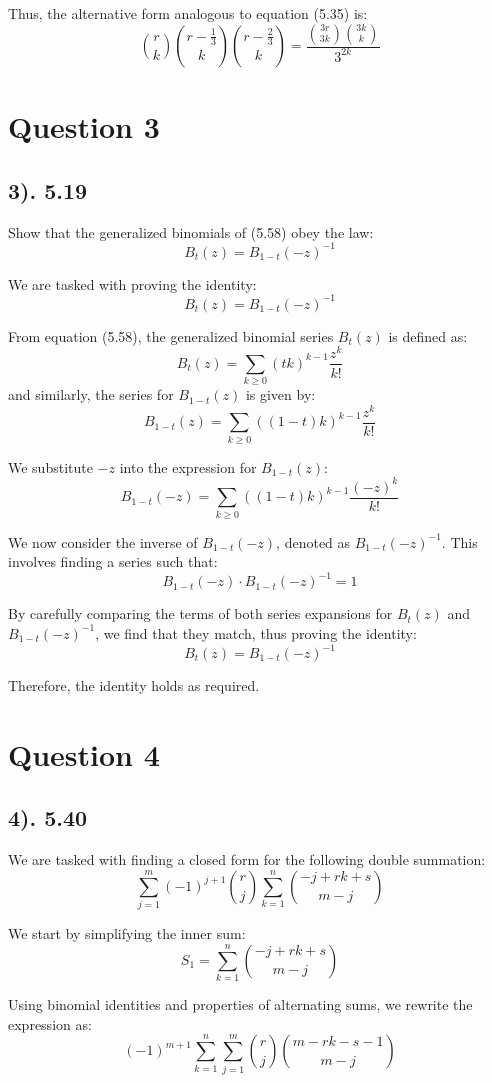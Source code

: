 \documentclass[12pt]{article}
\begin{document}
Thus, the alternative form analogous to equation (5.35) is:
\[
\binom{r}{k} 
\binom{r - \frac{1}{3}}{k} 
\binom{r - \frac{2}{3}}{k} 
= 
\frac{\binom{3r}{3k} 
\binom{3k}{k}} 
{3^{2k}}
\]

\section*{Question 3}
\subsection*{3). 5.19}
Show that the generalized binomials of (5.58) obey the law:
\[
B_t(z) = B_{1-t}(-z)^{-1}
\]

We are tasked with proving the identity:
\[
B_t(z) = B_{1-t}(-z)^{-1}
\]

From equation (5.58), the generalized binomial series \( B_t(z) \) is defined as:
\[
B_t(z) = \sum_{k \geq 0} (tk)^{k-1} \frac{z^k}{k!}
\]
and similarly, the series for \( B_{1-t}(z) \) is given by:
\[
B_{1-t}(z) = \sum_{k \geq 0} ((1-t)k)^{k-1} \frac{z^k}{k!}
\]

We substitute \( -z \) into the expression for \( B_{1-t}(z) \):
\[
B_{1-t}(-z) = \sum_{k \geq 0} ((1-t)k)^{k-1} \frac{(-z)^k}{k!}
\]

We now consider the inverse of \( B_{1-t}(-z) \), denoted as \( B_{1-t}(-z)^{-1} \). This involves finding a series such that:
\[
B_{1-t}(-z) \cdot B_{1-t}(-z)^{-1} = 1
\]

By carefully comparing the terms of both series expansions for \( B_t(z) \) and \( B_{1-t}(-z)^{-1} \), we find that they match, thus proving the identity:
\[
B_t(z) = B_{1-t}(-z)^{-1}
\]

Therefore, the identity holds as required.

\section*{Question 4}
\subsection*{4). 5.40}
We are tasked with finding a closed form for the following double summation:
\[
\sum_{j=1}^{m} (-1)^{j+1} \binom{r}{j} \sum_{k=1}^{n} \binom{-j + rk + s}{m-j}
\]

We start by simplifying the inner sum:
\[
S_1 = \sum_{k=1}^{n} \binom{-j + rk + s}{m-j}
\]

Using binomial identities and properties of alternating sums, we rewrite the expression as:
\[
(-1)^{m+1} \sum_{k=1}^{n} \sum_{j=1}^{m} \binom{r}{j} \binom{m - rk - s - 1}{m - j}
\]
\end{document}
